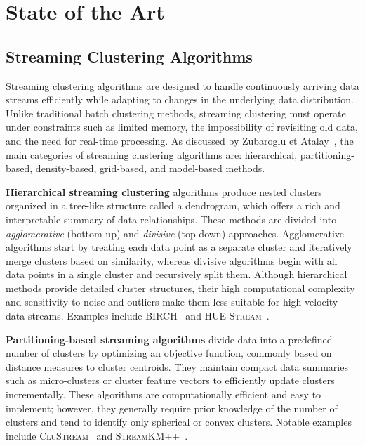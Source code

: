 \chapter{State of the Art}\label{ch:state_of_the_art}

\section{Streaming Clustering Algorithms}\label{sec:streaming_clustering_algorithms}

Streaming clustering algorithms are designed to handle continuously arriving
data streams efficiently while adapting to changes in the underlying data
distribution. Unlike traditional batch clustering methods, streaming clustering
must operate under constraints such as limited memory, the impossibility of
revisiting old data, and the need for real-time processing. As discussed by
Zubaroglu et Atalay~\cite{streaming_clustering_review}, the main categories of
streaming clustering algorithms are: hierarchical, partitioning-based,
density-based, grid-based, and model-based methods.

\textbf{Hierarchical streaming clustering} algorithms produce nested clusters organized
in a tree-like structure called a dendrogram, which offers a rich and interpretable
summary of data relationships. These methods are divided into \textit{agglomerative} (bottom-up)
and \textit{divisive} (top-down) approaches. Agglomerative algorithms start by treating
each data point as a separate cluster and iteratively merge clusters based on similarity,
whereas divisive algorithms begin with all data points in a single cluster and recursively
split them. Although hierarchical methods provide detailed cluster structures, their high
computational complexity and sensitivity to noise and outliers make them less suitable for
high-velocity data streams. Examples include \textsc{BIRCH}~\cite{birch} and
\textsc{HUE-Stream}~\cite{hue_stream}.

\textbf{Partitioning-based streaming algorithms} divide data into a predefined number of clusters
by optimizing an objective function, commonly based on distance measures to cluster centroids. They
maintain compact data summaries such as micro-clusters or cluster feature vectors to efficiently update
clusters incrementally. These algorithms are computationally efficient and easy to implement; however,
they generally require prior knowledge of the number of clusters and tend to identify only spherical
or convex clusters. Notable examples include \textsc{CluStream}~\cite{clustream} and
\textsc{StreamKM++}~\cite{stream_km_plus_plus}.

